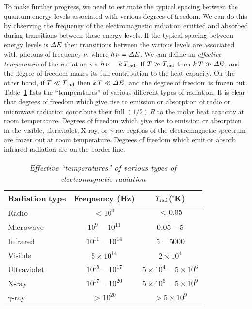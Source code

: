 To make further progress,  we need to
estimate  the typical spacing between the quantum energy levels
associated with various degrees of freedom. 
We can do this by observing the
frequency
 of the electromagnetic radiation emitted and absorbed during transitions between
these energy levels. If the typical spacing between energy levels is ${\mit\Delta} E$ then
transitions between the various levels are associated with photons of
frequency $\nu$, where $h\, \nu = {\mit\Delta} E$. We can define an {\em effective 
temperature}\/ of the radiation via $h \,\nu = k\, T_{\rm rad}$. If $T\gg T_{\rm rad}$
then $k\,T \gg {\mit\Delta} E$, and the degree of freedom makes its
full contribution  to the heat capacity. On the other hand, if $T\ll T_{\rm rad}$
then $k\,T \ll {\mit\Delta} E$, and the degree of freedom is frozen out. 
Table~\ref{t2} lists the ``temperatures'' of various different types of radiation.
It is clear that degrees of freedom which give rise to  emission or absorption
of radio or  microwave radiation   contribute their  full $(1/2)\, R$
to the molar heat capacity at room temperature. Degrees of freedom which give rise to
emission or absorption in the visible, ultraviolet, X-ray, or $\gamma$-ray
regions of the electromagnetic spectrum are frozen out at room temperature.
Degrees of freedom which emit or absorb infrared radiation are on the border line.
\begin{table}
\centering
\begin{tabular}{lcc}
Radiation type & Frequency (Hz) & $T_{\rm rad}$($^\circ$K)  \\[0.5ex] \hline
Radio & $<10^9$ & $<0.05$ \\
Microwave & $10^9$ -- $10^{11}$ & $0.05$ -- $5$ \\
Infrared & $10^{11}$ -- $10^{14}$ & $5$ -- $5000$ \\
Visible &  $5 \times 10^{14}$ & $2\times 10^4$ \\
Ultraviolet & $10^{15}$ -- $10^{17}$ & $5\times 10^4$ -- $5\times 10^6$ \\
X-ray & $10^{17}$ -- $10^{20}$ & $5\times 10^6$ -- $5\times 10^9$ \\
$\gamma$-ray & $>10^{20}$ & $>5\times 10^9 $ \\
\end{tabular}
\caption{\em Effective ``temperatures'' of various types of electromagnetic radiation}
\label{t2}
\end{table}

